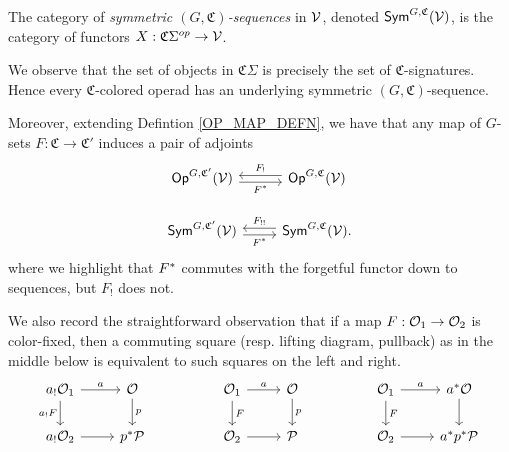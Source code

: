 \documentclass[a4paper,10pt
]{article}%
\renewcommand{\1}{\ensuremath{\mathbb{id}}}
\begin{document}
\begin{definition}
      The category of \textit{symmetric $(G,\mathfrak C)$-sequences} in $\mathcal V$, denoted $\mathsf{Sym}^{G,\mathfrak C}(\mathcal V)$, is
      the category of functors $X: \mathfrak C \Sigma^{op} \to \mathcal V$.
\end{definition}

\begin{remark}
      \label{COLOR_CHANGE_REM}
      We observe that the set of objects in $\mathfrak C\Sigma$ is precisely the set of $\mathfrak C$-signatures.
      Hence every $\mathfrak C$-colored operad has an underlying symmetric $(G,\mathfrak C)$-sequence.
      
      Moreover, extending Defintion \ref{OP_MAP_DEFN}, we have that any map of $G$-sets
      $F: \mathfrak C \to \mathfrak C'$ induces a pair of adjoints
      \begin{equation}
            \label{COLOR_CHANGE_EQ}
            \begin{tikzcd}
                  \Op^{G, \mathfrak C'}(\V) \arrow[r, shift right, "F^{\**}"'] %
                  &
                  \Op^{G, \mathfrak C}(\V) \arrow[l, shift right, "F_!"'] %
                  \\
                  \Sym^{G, \mathfrak C'}(\V) \arrow[r, shift right, "F^{\**}"']
                  &
                  \Sym^{G, \mathfrak C}(\V) \arrow[l, shift right, "F_{!!}"'].
            \end{tikzcd}
      \end{equation}
      where we highlight that $F^{\**}$ commutes with the forgetful functor down to sequences, but $F_!$ does not.
      
      We also record the straightforward observation that if a map $F: \mathcal{O}_1 \to \mathcal{O}_2$ is color-fixed, then
      a commuting square (resp. lifting diagram, pullback) as in the middle below is
      equivalent to such squares on the left and right.
      \begin{equation}
            \label{COLOR_SQ_EQ}
            \begin{tikzcd}
                  a_! \O_1 \arrow[d, "a_! F"'] \arrow[r, "a"]
                  &
                  \O \arrow[d, "p"]
                  &&
                  \O_1 \arrow[d, "F"] \arrow[r, "a"]
                  &
                  \O \arrow[d, "p"]
                  &&
                  \O_1 \arrow[d, "F"] \arrow[r, "a"]
                  &
                  a^{\**} \O \arrow[d]
                  \\
                  a_! \O_2 \arrow[r]
                  &
                  p^{\**} \P
                  &&
                  \O_2 \arrow[r]
                  &
                  \P
                  &&
                  \O_2 \arrow[r]
                  &
                  a^{\**} p^{\**} \P
            \end{tikzcd}
      \end{equation}
\end{remark}
\end{document}
